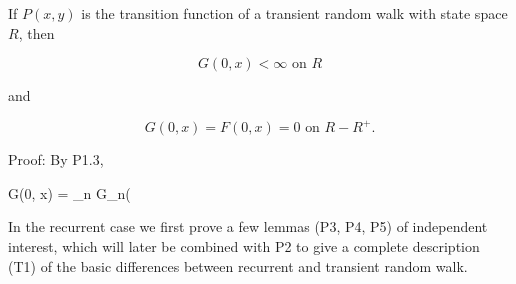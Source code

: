 If $P(x, y)$ is the transition function of a transient random walk with state space $R$, then

$$G(0, x) < \infty \text{ on } R$$

and

$$G(0, x) = F(0, x) = 0 \text{ on } R - R^+.$$

Proof: By P1.3,

$$G(0, x) = \lim_{n \to \infty} G_n(

In the recurrent case we first prove a few lemmas (P3, P4, P5) of independent interest, which will later be combined with P2 to give a complete description (T1) of the basic differences between recurrent and transient random walk.